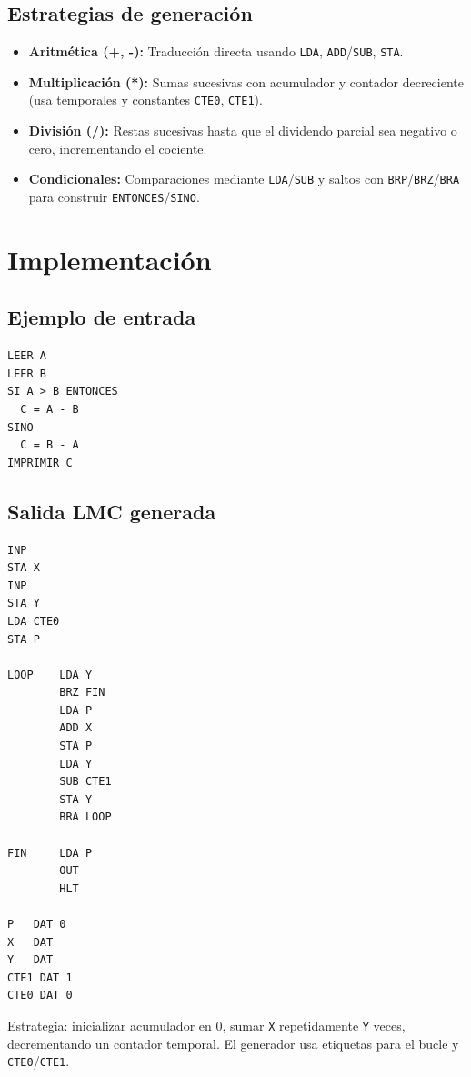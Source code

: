 \documentclass[12pt,a4paper]{article}
\begin{document}
\subsection{Estrategias de generación}
\begin{itemize}
  \item \textbf{Aritmética (+, -):} Traducción directa usando \texttt{LDA}, \texttt{ADD}/\texttt{SUB}, \texttt{STA}.
  \item \textbf{Multiplicación (*):} Sumas sucesivas con acumulador y contador decreciente (usa temporales y constantes \texttt{CTE0}, \texttt{CTE1}).
  \item \textbf{División (/):} Restas sucesivas hasta que el dividendo parcial sea negativo o cero, incrementando el cociente.
  \item \textbf{Condicionales:} Comparaciones mediante \texttt{LDA}/\texttt{SUB} y saltos con \texttt{BRP}/\texttt{BRZ}/\texttt{BRA} para construir \texttt{ENTONCES}/\texttt{SINO}.
\end{itemize}

\section{Implementación}
\subsection{Ejemplo de entrada}
\begin{lstlisting}[language=Pseudo,style=codeStyle]
LEER A
LEER B
SI A > B ENTONCES
  C = A - B
SINO
  C = B - A
IMPRIMIR C
\end{lstlisting}

\subsection{Salida LMC generada}
\begin{lstlisting}[language=LMC,style=codeStyle]
INP
STA X
INP
STA Y
LDA CTE0
STA P

LOOP    LDA Y
        BRZ FIN
        LDA P
        ADD X
        STA P
        LDA Y
        SUB CTE1
        STA Y
        BRA LOOP

FIN     LDA P
        OUT
        HLT

P   DAT 0
X   DAT
Y   DAT
CTE1 DAT 1
CTE0 DAT 0

\end{lstlisting}



\noindent Estrategia: inicializar acumulador en 0, sumar \texttt{X} repetidamente \texttt{Y} veces, decrementando un contador temporal. El generador usa etiquetas para el bucle y \texttt{CTE0}/\texttt{CTE1}.
\end{document}

